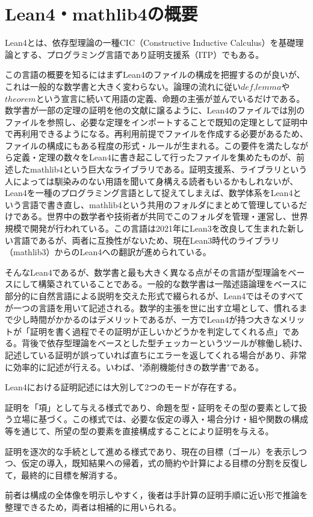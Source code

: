 \documentclass[a4paper,12pt]{bxjsbook}
\newlength{\customindent}
\newenvironment{body}{
  \par
  \begingroup
  \setlength{\leftskip}{\customindent}
  \setlength{\rightskip}{0pt}
  \setlength{\parindent}{1em}
  \setlength{\displayindent}{\customindent}
  \setlength{\displaywidth}{\dimexpr\linewidth-\customindent\relax}
}{
  \par
  \endgroup
}
\theoremstyle{theorem}
\begin{document}
    \section{Lean4・mathlib4の概要}
    \begin{body}
        \indent Lean4とは、依存型理論の一種CIC（Constructive Inductive Calculus）を基礎理論とする、プログラミング言語であり証明支援系（ITP）でもある。

        \indent この言語の概要を知るにはまずLean4のファイルの構成を把握するのが良いが、これは一般的な数学書と大きく変わらない。論理の流れに従い$def$,$lemma$や$theorem$という宣言に続いて用語の定義、命題の主張が並んでいるだけである。数学書が一部の定理の証明を他の文献に譲るように、Lean4のファイルでは別のファイルを参照し、必要な定理をインポートすることで既知の定理として証明中で再利用できるようになる。再利用前提でファイルを作成する必要があるため、ファイルの構成にもある程度の形式・ルールが生まれる。この要件を満たしながら定義・定理の数々をLean4に書き起こして行ったファイルを集めたものが、前述したmathlib4という巨大なライブラリである。証明支援系、ライブラリという人によっては馴染みのない用語を聞いて身構える読者もいるかもしれないが、Lean4を一種のプログラミング言語として捉えてしまえば、数学体系をLean4という言語で書き直し、mathlib4という共用のフォルダにまとめて管理しているだけである。世界中の数学者や技術者が共同でこのフォルダを管理・運営し、世界規模で開発が行われている。この言語は2021年にLean3を改良して生まれた新しい言語であるが、両者に互換性がないため、現在Lean3時代のライブラリ（mathlib3）からのLean4への翻訳が進められている。

        \indent そんなLean4であるが、数学書と最も大きく異なる点がその言語が型理論をベースにして構築されていることである。一般的な数学書は一階述語論理をベースに部分的に自然言語による説明を交えた形式で綴られるが、Lean4ではそのすべてが一つの言語を用いて記述される。数学的主張を世に出す立場として、慣れるまで少し時間がかかるのはデメリットであるが、一方でLean4が持つ大きなメリットが「証明を書く過程でその証明が正しいかどうかを判定してくれる点」である。背後で依存型理論をベースとした型チェッカーというツールが稼働し続け、記述している証明が誤っていれば直ちにエラーを返してくれる場合があり、非常に効率的に記述が行える。いわば、"添削機能付きの数学書"である。

        \indent Lean4における証明記述には大別して2つのモードが存在する。
        
        \begin{bodyitemize} 
            \item[項モード] 証明を「項」として与える様式であり、命題を型・証明をその型の要素として扱う立場に基づく。この様式では、必要な仮定の導入・場合分け・組や関数の構成等を通じて、所望の型の要素を直接構成することにより証明を与える。
            \item[タクティクモード] 証明を逐次的な手続として進める様式であり、現在の目標（ゴール）を表示しつつ、仮定の導入，既知結果への帰着，式の簡約や計算による目標の分割を反復して，最終的に目標を解消する。
        \end{bodyitemize}

        \indent 前者は構成の全体像を明示しやすく，後者は手計算の証明手順に近い形で推論を整理できるため，両者は相補的に用いられる。
    \end{body}
\end{document}
